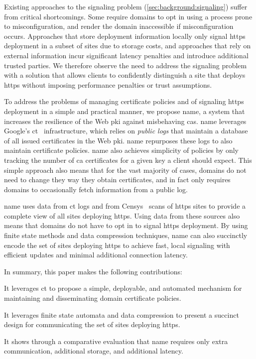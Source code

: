 Existing approaches to the signaling problem
(\autoref{sec:background:signaling}) suffer from critical shortcomings. Some
require domains to opt in using a process prone to misconfiguration, and render
the domain inaccessible if misconfiguration occurs. Approaches that store
deployment information locally only signal \ac{https} deployment in a subset of
sites due to storage costs, and approaches that rely on external information
incur significant latency penalties and introduce additional trusted parties. We
therefore observe the need to address the signaling problem with a solution that
allows clients to confidently distinguish a site that deploys \ac{https} without
imposing performance penalties or trust assumptions.

To address the problems of managing certificate policies and of signaling
\ac{https} deployment in a simple and practical manner, we propose \ac{name}, a
system that  increases the resilience of the Web \ac{pki}
against misbehaving \acp{ca}. \ac{name} leverages Google's
\ac{ct}~\cite{rfc6698} infrastructure, which relies on \emph{public logs} that
maintain a database of all issued certificates in the Web \ac{pki}.
\ac{name} repurposes these logs to also maintain certificate policies. \ac{name}
also achieves simplicity of policies by only tracking the number of \ac{ca}
certificates for a given key a client should expect. This simple approach also
means that for the vast majority of cases, domains do not need to change they
way they obtain certificates, and in fact only requires domains to occasionally
fetch information from a public log.

\ac{name} uses data from \ac{ct} logs and from Censys~\cite{durumeric2015search}
scans of \ac{https} sites to provide a complete view of all sites deploying
\ac{https}. Using data from these sources also means that domains do not have to
opt in to signal \ac{https} deployment. By using finite state methods and data
compression techniques, \ac{name} can also succinctly encode the set of sites
deploying \ac{https} to achieve fast, local signaling with efficient updates and
minimal additional connection latency.

In summary, this paper makes the following contributions:
\begin{compactitem}
\item It leverages \ac{ct} to propose a simple, deployable, and automated
  mechanism for maintaining and disseminating domain certificate policies.
\item It leverages finite state automata and data compression to present  a
  succinct design for communicating the set of sites deploying \ac{https}.
\item It shows through a comparative evaluation that \ac{name} requires only
  \steve{} extra communication, \steve{} additional storage, and \steve{}
  additional latency.
\end{compactitem}

